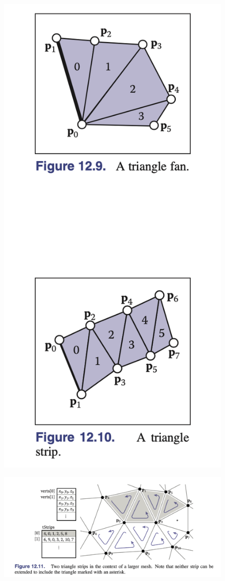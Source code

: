 \documentclass[11pt]{article}
\numberwithin{equation}{section}
\begin{document}
\begin{figure}[H]
	\centering
	\includegraphics[scale=0.5]{p19}
\end{figure}
\begin{figure}[H]
	\centering
	\includegraphics[scale=0.5]{p20}
\end{figure}
\end{document}
